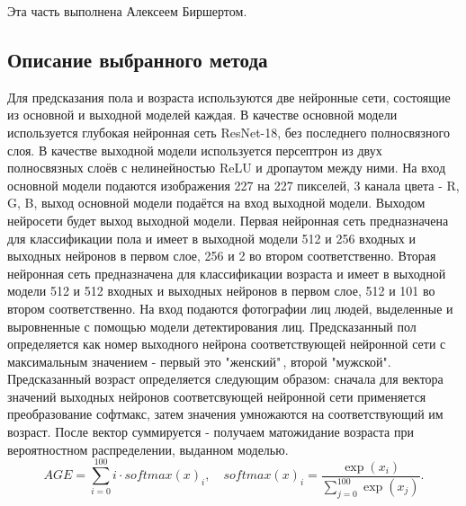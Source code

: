 Эта часть выполнена Алексеем Биршертом. \\

\subsection{Описание выбранного метода}\label{subsec:описание-метода}
Для предсказания пола и возраста используются две нейронные сети, состоящие из основной и выходной моделей каждая.
В качестве основной модели используется глубокая нейронная сеть ResNet-18, без последнего полносвязного слоя.
В качестве выходной модели используется персептрон из двух полносвязных слоёв с нелинейностью ReLU и дропаутом между ними.
На вход основной модели подаются изображения 227 на 227 пикселей, 3 канала цвета - R, G, B,
выход основной модели подаётся на вход выходной модели.
Выходом нейросети будет выход выходной модели.
Первая нейронная сеть предназначена для классификации пола и имеет в выходной модели 512 и 256 входных и выходных нейронов в первом слое, 256 и 2 во втором соответственно.
Вторая нейронная сеть предназначена для классификации возраста и имеет в выходной модели 512 и 512 входных и выходных нейронов в первом слое, 512 и 101 во втором соответственно.
На вход подаются фотографии лиц людей, выделенные и выровненные с помощью модели детектирования лиц.
Предсказанный пол определяется как номер выходного нейрона соответствующей нейронной сети с максимальным значением -
первый это "женский"\,, второй "мужской".
Предсказанный возраст определяется следующим образом: сначала для вектора значений выходных нейронов
соответсвующей нейронной сети применяется преобразование софтмакс, затем значения умножаются на соответствующий
им возраст.
После вектор суммируется - получаем матожидание возраста при вероятностном распределении, выданном моделью.
\[AGE = \sum\limits_{i = 0}^{100}i \cdot softmax(x)_i, \quad softmax(x)_i = \frac{\exp(x_i)}{\sum\limits_{j =
0}^{100}\exp(x_j)}.\]

